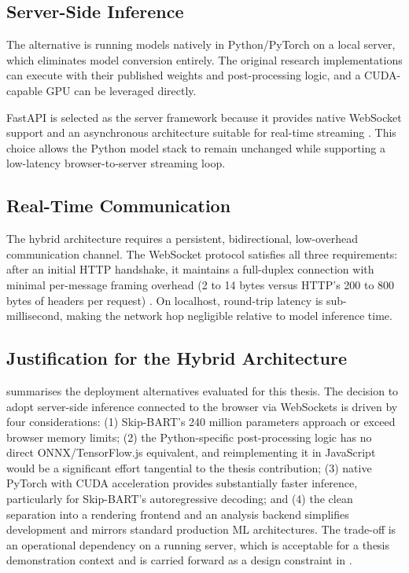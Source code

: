 \subsection{Server-Side Inference}

The alternative is running models natively in Python/PyTorch on a local server, which eliminates model conversion entirely. The original research implementations can execute with their published weights and post-processing logic, and a CUDA-capable GPU can be leveraged directly.

FastAPI is selected as the server framework because it provides native WebSocket support and an asynchronous architecture suitable for real-time streaming \cite{fastapi-docs}. This choice allows the Python model stack to remain unchanged while supporting a low-latency browser-to-server streaming loop.

\subsection{Real-Time Communication}
\label{sec:ch3-realtime-communication}

The hybrid architecture requires a persistent, bidirectional, low-overhead communication channel. The WebSocket protocol satisfies all three requirements: after an initial HTTP handshake, it maintains a full-duplex connection with minimal per-message framing overhead (2 to 14 bytes versus HTTP's 200 to 800 bytes of headers per request) \cite{postman-websockets-vs-http}. On localhost, round-trip latency is sub-millisecond, making the network hop negligible relative to model inference time.

\subsection{Justification for the Hybrid Architecture}

 summarises the deployment alternatives evaluated for this thesis. The decision to adopt server-side inference connected to the browser via WebSockets is driven by four considerations: (1) Skip-BART's 240 million parameters approach or exceed browser memory limits; (2) the Python-specific post-processing logic has no direct ONNX/TensorFlow.js equivalent, and reimplementing it in JavaScript would be a significant effort tangential to the thesis contribution; (3) native PyTorch with CUDA acceleration provides substantially faster inference, particularly for Skip-BART's autoregressive decoding; and (4) the clean separation into a rendering frontend and an analysis backend simplifies development and mirrors standard production ML architectures. The trade-off is an operational dependency on a running server, which is acceptable for a thesis demonstration context and is carried forward as a design constraint in .

